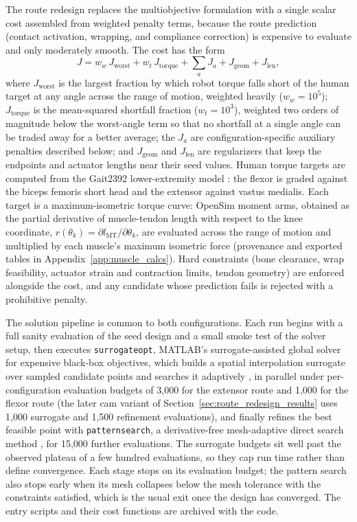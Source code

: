 The route redesign replaces the multiobjective formulation with a single scalar cost assembled from weighted penalty terms, because the route prediction (contact activation, wrapping, and compliance correction) is expensive to evaluate and only moderately smooth. The cost has the form
\begin{equation}
    J = w_{w}\,J_{\text{worst}} + w_{t}\,J_{\text{torque}} + \textstyle\sum_{a} J_{a} + J_{\text{geom}} + J_{\text{len}},
    \label{eq:opt_cost}
\end{equation}
where $J_{\text{worst}}$ is the largest fraction by which robot torque falls short of the human target at any angle across the range of motion, weighted heavily ($w_{w} = 10^{5}$); $J_{\text{torque}}$ is the mean-squared shortfall fraction ($w_{t} = 10^{3}$), weighted two orders of magnitude below the worst-angle term so that no shortfall at a single angle can be traded away for a better average; the $J_{a}$ are configuration-specific auxiliary penalties described below; and $J_{\text{geom}}$ and $J_{\text{len}}$ are regularizers that keep the endpoints and actuator lengths near their seed values. Human torque targets are computed from the Gait2392 lower-extremity model \citep{delp_opensim_2007, seth_opensim_2018}: the flexor is graded against the biceps femoris short head and the extensor against vastus medialis. Each target is a maximum-isometric torque curve: OpenSim moment arms, obtained as the partial derivative of muscle-tendon length with respect to the knee coordinate, $r(\theta_{k}) = \partial l_{\mathrm{MT}}/\partial\theta_{k}$, are evaluated across the range of motion and multiplied by each muscle's maximum isometric force (provenance and exported tables in Appendix~\ref{app:muscle_calcs}). Hard constraints (bone clearance, wrap feasibility, actuator strain and contraction limits, tendon geometry) are enforced alongside the cost, and any candidate whose prediction fails is rejected with a prohibitive penalty.

The solution pipeline is common to both configurations. Each run begins with a full sanity evaluation of the seed design and a small smoke test of the solver setup, then executes \texttt{surrogateopt}, MATLAB's surrogate-assisted global solver for expensive black-box objectives, which builds a spatial interpolation surrogate over sampled candidate points and searches it adaptively \citep{mathworks_optimization_2025}, in parallel under per-configuration evaluation budgets of 3,000 for the extensor route and 1,000 for the flexor route (the later cam variant of Section~\ref{sec:route_redesign_results} uses 1,000 surrogate and 1,500 refinement evaluations), and finally refines the best feasible point with \texttt{patternsearch}, a derivative-free mesh-adaptive direct search method \citep{audet_mads_2006, mathworks_optimization_2025}, for 15,000 further evaluations. The surrogate budgets sit well past the observed plateau of a few hundred evaluations, so they cap run time rather than define convergence. Each stage stops on its evaluation budget; the pattern search also stops early when its mesh collapses below the mesh tolerance with the constraints satisfied, which is the usual exit once the design has converged. The entry scripts and their cost functions are archived with the code.

